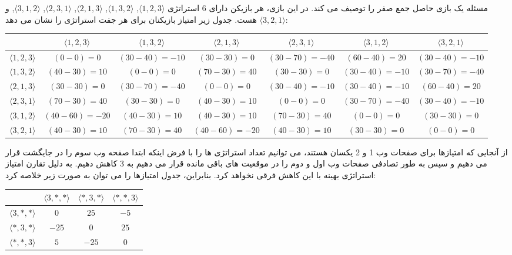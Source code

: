 \begin{solution}
مسئله یک بازی حاصل جمع صفر را توصیف می کند. در این بازی، هر بازیکن دارای 6 استراتژی 
$\langle 1, 2, 3 \rangle$, $\langle 1, 3, 2 \rangle$, $\langle 2, 1, 3 \rangle$, $\langle 2, 3, 1 \rangle$, $\langle 3, 1, 2 \rangle$,  و $\langle 3, 2, 1 \rangle$
هست. جدول زیر امتیاز بازیکنان برای هر جفت استراتژی را نشان می دهد:

\begin{center}
\begin{tabular}{|c|c|c|c|c|c|c|}
\hline
& $\langle 1, 2, 3\rangle$& $\langle 1, 3, 2\rangle$& $\langle 2, 1, 3\rangle$& $\langle 2, 3, 1\rangle$& $\langle 3, 1, 2\rangle$& $\langle 3, 2, 1\rangle$\\
\hline
$\langle 1, 2, 3\rangle$& $(0-0)=0$& $(30-40)=-10$& $(30-30)=0$& $(30-70)=-40$& $(60-40)=20$& $(30-40)=-10$\\
\hline
$\langle 1, 3, 2\rangle$& $(40-30)=10$& $(0-0)=0$& $(70-30)=40$& $(30-30)=0$& $(30-40)=-10$& $(30-70)=-40$\\
\hline
$\langle 2, 1, 3\rangle$& $(30-30)=0$& $(30-70)=-40$& $(0-0)=0$& $(30-40)=-10$& $(30-40)=-10$& $(60-40)=20$\\
\hline
$\langle 2, 3, 1\rangle$& $(70-30)=40$& $(30-30)=0$& $(40-30)=10$& $(0-0)=0$& $(30-70)=-40$& $(30-40)=-10$\\
\hline
$\langle 3, 1, 2\rangle$& $(40-60)=-20$& $(40-30)=10$& $(40-30)=10$& $(70-30)=40$& $(0-0)=0$& $(30-30)=0$\\
\hline
$\langle 3, 2, 1\rangle$& $(40-30)=10$& $(70-30)=40$& $(40-60)=-20$& $(40-30)=10$& $(30-30)=0$& $(0-0)=0$\\

\hline
\end{tabular}
\end{center}

از آنجایی که امتیازها برای صفحات وب 1 و 2 یکسان هستند، می توانیم تعداد استراتژی ها را با فرض اینکه ابتدا صفحه وب سوم را در جایگشت قرار می دهیم و سپس به طور تصادفی صفحات وب اول و دوم را در موقعیت های باقی مانده قرار می دهیم به 3 کاهش دهیم. به دلیل تقارن امتیاز استراتژی بهینه با این کاهش فرقی نخواهد کرد. بنابراین، جدول امتیازها را می توان به صورت زیر خلاصه کرد:


\begin{center}
\begin{tabular}{|c|c|c|c|}
\hline
& $\langle 3, *, *\rangle$& $\langle *, 3, *\rangle$& $\langle *, *, 3\rangle$\\
\hline
$\langle 3, *, *\rangle$& $0$& $25$& $-5$\\
\hline
$\langle *, 3, *\rangle$& $-25$& $0$& $25$\\
\hline
$\langle *, *, 3\rangle$& $5$& $-25$& $0$\\
\hline
\end{tabular}
\end{center}


\end{solution}
